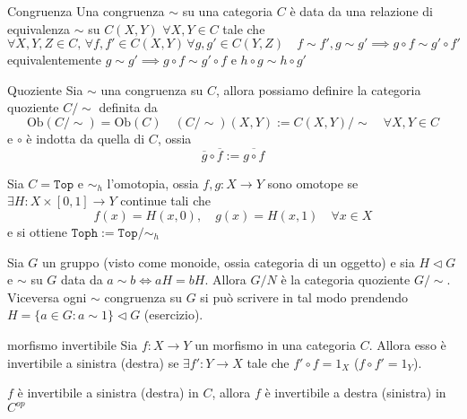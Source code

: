 \begin{definition}{Congruenza}
    Una congruenza \(\sim \) su una categoria \(C\) è data da una relazione di
    equivalenza \(\sim \) su \(C{(X, Y)}\) \(\forall X, Y \in C\) tale che
    \[
      \forall X, Y, Z \in C, \, \forall f, f' \in C{(X, Y)} \, \forall g,
      g' \in C{(Y, Z)} \quad f \sim f', g \sim g' \implies g \circ f \sim g'
      \circ f'
    \]
    equivalentemente \(g \sim g' \implies g \circ f \sim g' \circ f\) e \(h \circ g \sim h \circ g'\) 
\end{definition}

\begin{definition}{Quoziente}
    Sia \(\sim \) una congruenza su \(C\), allora possiamo definire la categoria
    quoziente \(C / \sim \) definita da
    \[
      \mathrm{Ob}{(C / \sim )} = \mathrm{Ob}{(C)} \quad {(C / \sim )}{(X, Y)} :=
      C{(X, Y)} / \sim \quad \forall X, Y \in C
    \]
    e \(\circ\) è indotta da quella di \(C\), ossia
    \[
      \overline{g} \circ \overline{f} := \overline{g \circ f}
    \]
\end{definition}

\begin{example}[Omotopia]
    Sia \(C = \mathtt{Top}\) e \(\sim_h \) l'omotopia, ossia \(f, g : X \to Y\)
    sono omotope se \(\exists  H : X \times [0, 1] \to Y\) continue tali che 
    \[
      f{(x)} = H{(x, 0)}, \quad g{(x)} = H{(x, 1)} \quad \forall x \in X
    \]
    e si ottiene \(\mathtt{Toph} := \mathtt{Top} / \sim_h \) 
\end{example}

\begin{example}
    Sia \(G\) un gruppo (visto come monoide, ossia categoria di un oggetto) e
    sia \(H \vartriangleleft G\) e \(\sim \) su \(G\) data da \(a \sim b \iff aH
    = bH\). Allora \(G/N\) è la categoria quoziente \(G / \sim \).
    Viceversa ogni \(\sim \) congruenza su \(G\) si può scrivere in tal
    modo prendendo \(H = \{a \in G : a \sim 1\} \vartriangleleft G \) (esercizio).
\end{example}

\begin{definition}{morfismo invertibile}
    Sia \(f : X\to Y\) un morfismo in una categoria \(C\). Allora esso è
    invertibile a sinistra (destra) se \(\exists  f' : Y \to X\) tale che
    \(f' \circ f = 1_X\) (\(f \circ f' = 1_Y\)).
\end{definition}
\begin{remark}{}
    \(f\) è invertibile a sinistra (destra) in \(C\), allora \(f\) è invertibile
    a destra (sinistra) in \(C^{op}\) 
\end{remark}


